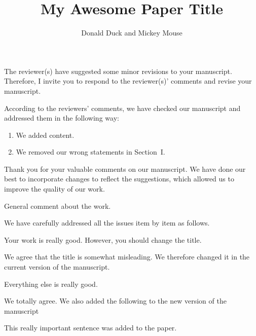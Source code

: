 \documentclass[12pt,english]{reviewresponse}
\title{My Awesome Paper Title}
\author{Donald Duck and Mickey Mouse}
\begin{document}
\maketitle



\editor
\begin{generalcomment}
  The reviewer(s) have suggested some minor revisions to your manuscript. Therefore, I invite you to respond to the reviewer(s)' comments and revise your manuscript.
\end{generalcomment}
\begin{revresponse}
  According to the reviewers' comments, we have checked our manuscript and addressed them in the following way:
  \begin{enumerate}
    \item We added content.
    \item We removed our wrong statements in Section~I.
  \end{enumerate}
\end{revresponse}
\begin{concludingresponse}
  Thank you for your valuable comments on our manuscript.
  We have done our best to incorporate changes to reflect the suggestions, which allowed us to improve the quality of our work.
\end{concludingresponse}

\reviewer
\begin{generalcomment}
  General comment about the work.
\end{generalcomment}
\begin{revresponse}
  We have carefully addressed all the issues item by item as follows.
\end{revresponse}

\begin{revcomment}
  Your work is really good. However, you should change the title.
\end{revcomment}
\begin{revresponse}
  We agree that the title is somewhat misleading.
  We therefore changed it in the current version of the manuscript.
\end{revresponse}

\begin{revcomment}
  Everything else is really good.
\end{revcomment}
\begin{revresponse}
  We totally agree. We also added the following to the new version of the manuscript
  \begin{changes}
    This really important sentence was added to the paper.
  \end{changes}
\end{revresponse}
\end{document}
